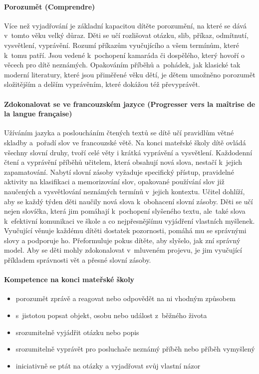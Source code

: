 			\paragraph{Porozumět (Comprendre)}
			Více než vyjadřování je základní kapacitou dítěte porozumění, na které se dává v tomto věku velký důraz.
			Děti se učí rozlišovat otázku, slib, příkaz, odmítnutí, vysvětlení, vyprávění. Rozumí příkazům vyučujícího a všem termínům, které k tomu patří. Jsou vedené k pochopení kamaráda či dospělého, který hovoří o věcech pro dítě neznámých. Opakováním příběhů a pohádek, jak klasické tak moderní literatury, které jsou přiměřené věku dětí, je dětem umožněno porozumět složitějším a delším vyprávěním, které dokážou též převyprávět. 

			\paragraph{Zdokonalovat se ve francouzském jazyce (Progresser vers la maîtrise de la langue française)}
			Užíváním jazyka a posloucháním čtených textů se dítě učí pravidlům větné skladby a pořadí slov ve francouzské větě. Na konci mateřské školy dítě ovládá všechny slovní druhy, tvoří celé věty i krátká vyprávění a vysvětlení. Každodenní čtení a vyprávění příběhů učitelem, která obsahují nová slova, nestačí k jejich zapamatování. Nabytí slovní zásoby vyžaduje specifický přístup, pravidelné aktivity na klasifikaci a memorizování slov, opakované používání slov již naučených a vysvětlování neznámých termínů v jejich kontextu. Učitel dohlíží, aby se každý týden děti naučily nová slova k obohacení slovní zásoby. Děti se učí nejen slovíčka, která jim pomáhají k pochopení slyšeného textu, ale také slova k efektivní komunikaci ve škole a co nejpřesnějšímu vyjádření vlastních myšlenek. Vyučující věnuje každému dítěti dostatek pozornosti, pomáhá mu se správnými slovy a podporuje ho. Přeformuluje pokus dítěte, aby slyšelo, jak zní správný model. Aby se děti mohly zdokonalovat v mluveném projevu, je jim vyučující příkladem správnosti vět a přesné slovní zásoby.

			\paragraph{Kompetence na konci mateřské školy}
			\begin{itemize}
			\item porozumět zprávě a reagovat nebo odpovědět na ni vhodným způsobem
			\item s jistotou popsat objekt, osobu nebo událost z běžného života
			\item srozumitelně vyjádřit otázku nebo popis
			\item srozumitelně vyprávět pro posluchače neznámý příběh nebo příběh vymyšlený 
			\item iniciativně se ptát na otázky a vyjadřovat svůj vlastní názor
			\end{itemize}


